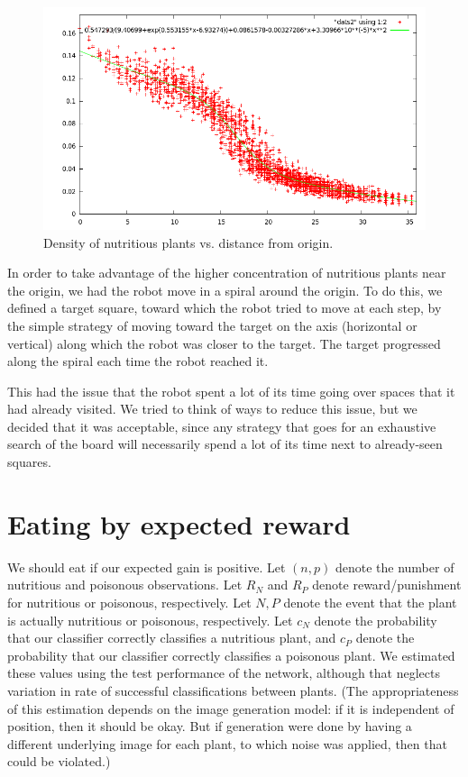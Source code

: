 \documentclass{article}
\begin{document}
\begin{figure}[h]
  \includegraphics[width=\columnwidth]{nutritiousmodel.png}
  \caption{Density of nutritious plants vs. distance from origin.}
  \label{fig:plant_freq}
\end{figure}

In order to take advantage of the higher concentration of nutritious
plants near the origin, we had the robot move in a spiral around the
origin. To do this, we defined a target square, toward which the robot
tried to move at each step, by the simple strategy of moving toward
the target on the axis (horizontal or vertical) along which the robot
was closer to the target. The target progressed along the spiral each
time the robot reached it.

This had the issue that the robot spent a lot of its time going over
spaces that it had already visited. We tried to think of ways to
reduce this issue, but we decided that it was acceptable, since any
strategy that goes for an exhaustive search of the board will
necessarily spend a lot of its time next to already-seen squares.

\section{Eating by expected reward}
\label{sec:eating}
We should eat if our expected gain is positive. Let $(n,p)$ denote the
number of nutritious and poisonous observations. Let $R_N$ and $R_P$
denote reward/punishment for nutritious or poisonous,
respectively. Let $N,P$ denote the event that the plant is actually
nutritious or poisonous, respectively. Let $c_N$ denote the
probability that our classifier correctly classifies a nutritious
plant, and $c_P$ denote the probability that our classifier correctly
classifies a poisonous plant. We estimated these values using the test
performance of the network, although that neglects variation in rate
of successful classifications between plants. (The appropriateness of
this estimation depends on the image generation model: if it is
independent of position, then it should be okay. But if generation
were done by having a different underlying image for each plant, to
which noise was applied, then that could be violated.)
\end{document}
